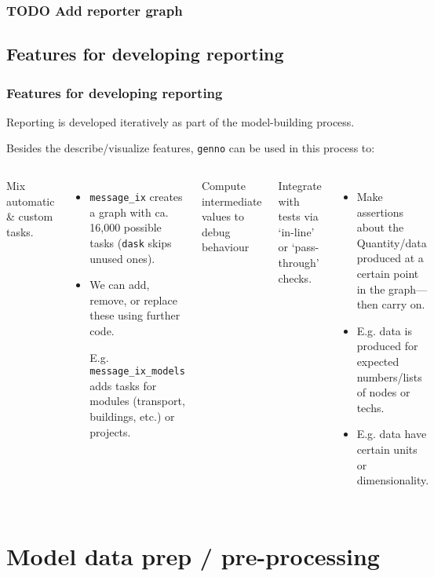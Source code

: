 \documentclass[12pt,aspectratio=169]{beamer}
\renewcommand{\mod}[1]{\texttt{#1}}
\begin{document}
\begin{frame}
\frametitle{TODO Add reporter graph}

\end{frame}

\subsection{Features for developing reporting}

\begin{frame}
\frametitle{Features for developing reporting}
\vspace*{-2mm}
Reporting is developed iteratively as part of the model-building process.

Besides the describe/visualize features,
\mod{genno} can be used in this process to:

\begin{columns}[T]
Mix automatic \& custom tasks.
\begin{itemize}
  \item \mod{message_ix} creates a graph with ca. 16,000 possible tasks (\texttt{dask} skips unused ones).
  \item We can add, remove, or replace these using further code.

    E.g. \mod{message_ix_models} adds tasks for modules (transport, buildings, etc.) or projects.
\end{itemize}

Compute intermediate values to debug behaviour

Integrate with tests via ‘in-line' or ‘pass-through' checks.
\begin{itemize}
  \item Make assertions about the Quantity/data produced
    at a certain point in the graph—then carry on.
  \item E.g. data is produced for expected numbers/lists of nodes or techs.
  \item E.g. data have certain units or dimensionality.
\end{itemize}
\end{columns}
\end{frame}

\section{Model data prep / pre-processing}
\end{document}
